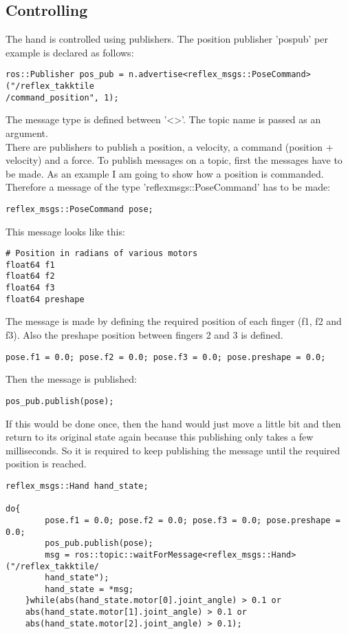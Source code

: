 \documentclass[11pt,a4paper]{report}
\begin{document}
\subsection{Controlling} \label{ControllingHand}
The hand is controlled using publishers. The position publisher 'pos\textunderscore pub' per example is declared as follows:
\begin{verbatim}
ros::Publisher pos_pub = n.advertise<reflex_msgs::PoseCommand>("/reflex_takktile
/command_position", 1);
\end{verbatim}
The message type is defined between '\textless \textgreater'. The topic name is passed as an argument.\\
There are publishers to publish a position, a velocity, a command (position + velocity) and a force. To publish messages on a topic, first the messages have to be made. As an example I am going to show how a position is commanded.
Therefore a message of the type 'reflex\textunderscore msgs::PoseCommand' has to be made:
\begin{verbatim}
reflex_msgs::PoseCommand pose;
\end{verbatim}
This message looks like this:
\begin{verbatim}
# Position in radians of various motors
float64 f1
float64 f2
float64 f3
float64 preshape
\end{verbatim}
The message is made by defining the required position of each finger (f1, f2 and f3). Also the preshape position between fingers 2 and 3 is defined.
\begin{verbatim}
pose.f1 = 0.0; pose.f2 = 0.0; pose.f3 = 0.0; pose.preshape = 0.0;
\end{verbatim}
Then the message is published:
\begin{verbatim}
pos_pub.publish(pose);
\end{verbatim}
If this would be done once, then the hand would just move a little bit and then return to its original state again because this publishing only takes a few milliseconds. So it is required to keep publishing the message until the required position is reached.
\begin{verbatim}
reflex_msgs::Hand hand_state;

do{
	    pose.f1 = 0.0; pose.f2 = 0.0; pose.f3 = 0.0; pose.preshape = 0.0;
	    pos_pub.publish(pose);
	    msg = ros::topic::waitForMessage<reflex_msgs::Hand>("/reflex_takktile/	
	    hand_state");
	    hand_state = *msg;
	}while(abs(hand_state.motor[0].joint_angle) > 0.1 or
	abs(hand_state.motor[1].joint_angle) > 0.1 or
	abs(hand_state.motor[2].joint_angle) > 0.1);
\end{verbatim}
\end{document}
